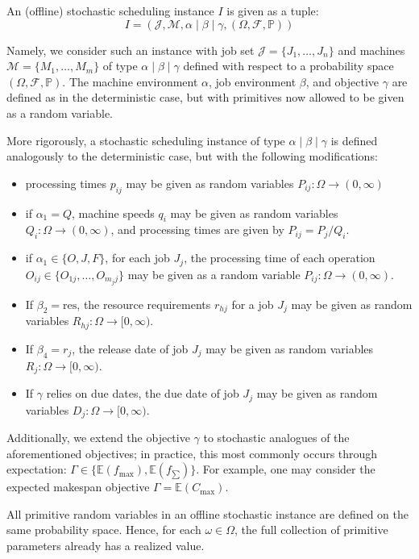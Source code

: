 \begin{definition}

An (offline) stochastic scheduling instance $I$ is given as a tuple:
$$
I= (\mathcal{J}, \mathcal{M}, \alpha \mid  \beta \mid  \gamma, (\Omega, \mathcal{F}, \mathbb{P}))
$$

Namely, we consider such an instance with job set $\mathcal{J} = \{J_1,\dots,J_n\}$ and machines $\mathcal{M} = \{M_1,\dots,M_m\}$ of type $\alpha \mid  \beta \mid  \gamma$ defined with respect to a probability space $(\Omega, \mathcal{F}, \mathbb{P})$. The machine environment $\alpha$, job environment $\beta$, and objective $\gamma$ are defined as in the deterministic case, but with primitives now allowed to be given as a random variable.

More rigorously, a stochastic scheduling instance of type $\alpha\mid \beta\mid \gamma$ is defined analogously to the deterministic case, but with the following modifications:
\begin{itemize}
    \item processing times $p_{ij}$ may be given as random variables $P_{ij}:\Omega\to(0,\infty)$
    \item if $\alpha_1=Q$, machine speeds $q_i$ may be given as random variables $Q_i:\Omega\to(0,\infty)$, and processing times are given by $P_{ij} = P_j / Q_i$.
    \item if $\alpha_1\in\{O,J,F\}$, for each job $J_j$, the processing time of each operation $O_{ij} \in \{O_{1j},\dots,O_{m_j j}\}$ may be given as a random variable $P_{ij}:\Omega\to (0,\infty)$. 
    \item If $\beta_2 = \mathrm{res}$, the resource requirements $r_{hj}$ for a job $J_j$ may be given as random variables $R_{hj}:\Omega\to[0,\infty)$.
    \item If $\beta_4 = r_j$, the release date of job $J_j$ may be given as random variables $R_j:\Omega\to[0,\infty)$.
    \item If $\gamma$ relies on due dates, the due date of job $J_j$ may be given as random variables $D_j:\Omega\to[0,\infty)$.
\end{itemize}

Additionally, we extend the objective \(\gamma\) to stochastic analogues of the aforementioned objectives; in practice, this most commonly occurs through expectation: $\Gamma \in \{\mathbb{E}(f_{\max}), \mathbb{E}(f_{\sum})\}$. For example, one may consider the expected makespan objective $\Gamma = \mathbb{E}(C_{\max})$.
\end{definition}
\begin{remark}
All primitive random variables in an offline stochastic instance are defined on the same probability space. Hence, for each \(\omega\in\Omega\), the full collection of primitive parameters already has a realized value.
\end{remark}

